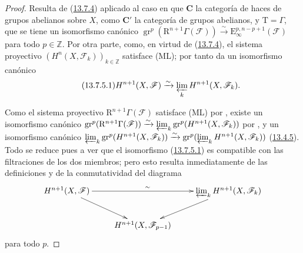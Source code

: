 \begin{proof}
Resulta de (\hyperref[0.13.7.4-fr]{13.7.4}) aplicado al caso en que $\boldsymbol{C}$ la categoría de haces de
grupos abelianos sobre $X$, como $\boldsymbol{C}'$ la categoría de grupos abelianos,
y $\mathrm T=\Gamma$, que se tiene un isomorfismo
canónico
$\operatorname{gr}^p(\mathrm R^{n+1}\Gamma(\boldsymbol{\mathcal F}))
\xrightarrow{\sim}\mathrm E_\infty^{p,n-p+1}(\boldsymbol{\mathcal F})$ para todo $p\in\mathbb Z$. Por otra parte, como, en virtud de (\hyperref[0.13.7.4-fr]{13.7.4}), el sistema proyectivo $(H^n(X,\mathcal F_k))_{k\in\mathbb Z}$ satisface {\rm(ML)}; por tanto
 da un isomorfismo canónico
\begin{equation}
\label{0.13.7.5.1b-fr}
\tag{13.7.5.1}
H^{n+1}(X,\mathcal F)\xrightarrow{\sim}
\varprojlim_k H^{n+1}(X,\mathcal F_k).
\end{equation}

Como el sistema proyectivo
$\mathrm R^{n+1}\Gamma(\boldsymbol{\mathcal F})$ satisface {\rm(ML)} por
, existe un isomorfismo canónico
$\operatorname{gr}^p(\mathrm R^{n+1}\Gamma(\boldsymbol{\mathcal F}))
\xrightarrow{\sim}
\varprojlim_k\operatorname{gr}^p(H^{n+1}(X,\mathcal F_k))$
por , y un isomorfismo canónico
$\varprojlim_k\operatorname{gr}^p(H^{n+1}(X,\mathcal F_k))
\xrightarrow{\sim}
\operatorname{gr}^p(\varprojlim_k H^{n+1}(X,\mathcal F_k))$
(\hyperref[0.13.4.5-fr]{13.4.5}). Todo se reduce pues a ver que
el isomorfismo (\hyperref[0.13.7.5.1-fr]{13.7.5.1}) es compatible con
las filtraciones de los dos miembros; pero esto resulta inmediatamente de las
definiciones y de la conmutatividad del diagrama
\[
\xymatrix{
H^{n+1}(X,\mathcal F)\ar[rr]^{\sim}\ar[dr]
&&\varprojlim_k H^{n+1}(X,\mathcal F_k)\ar[dl]\\
&H^{n+1}(X,\mathcal F_{p-1})&
}
\]
para todo $p$.
\end{proof}

